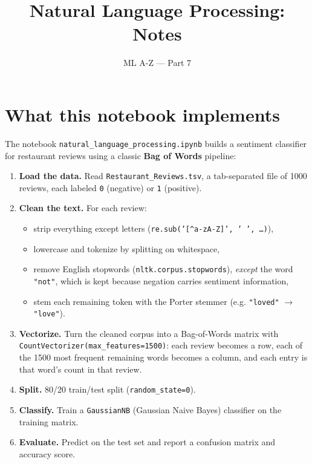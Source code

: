 \documentclass[11pt]{article}
\title{Natural Language Processing: Notes}
\author{ML A-Z --- Part 7}
\date{}
\begin{document}
\maketitle

\section{What this notebook implements}

The notebook \texttt{natural\_language\_processing.ipynb} builds a
sentiment classifier for restaurant reviews using a classic
\textbf{Bag of Words} pipeline:

\begin{enumerate}
  \item \textbf{Load the data.} Read \texttt{Restaurant\_Reviews.tsv},
        a tab-separated file of 1000 reviews, each labeled \texttt{0}
        (negative) or \texttt{1} (positive).
  \item \textbf{Clean the text.} For each review:
        \begin{itemize}
          \item strip everything except letters (\texttt{re.sub('[\^{}a-zA-Z]', ' ', \dots)}),
          \item lowercase and tokenize by splitting on whitespace,
          \item remove English stopwords (\texttt{nltk.corpus.stopwords}),
                \emph{except} the word \texttt{"not"}, which is kept because
                negation carries sentiment information,
          \item stem each remaining token with the Porter stemmer
                (e.g. \texttt{"loved"} $\to$ \texttt{"love"}).
        \end{itemize}
  \item \textbf{Vectorize.} Turn the cleaned corpus into a Bag-of-Words
        matrix with \texttt{CountVectorizer(max\_features=1500)}: each
        review becomes a row, each of the 1500 most frequent remaining
        words becomes a column, and each entry is that word's count in
        that review.
  \item \textbf{Split.} 80/20 train/test split (\texttt{random\_state=0}).
  \item \textbf{Classify.} Train a \texttt{GaussianNB} (Gaussian Naive
        Bayes) classifier on the training matrix.
  \item \textbf{Evaluate.} Predict on the test set and report a
        confusion matrix and accuracy score.

\end{enumerate}
\end{document}
